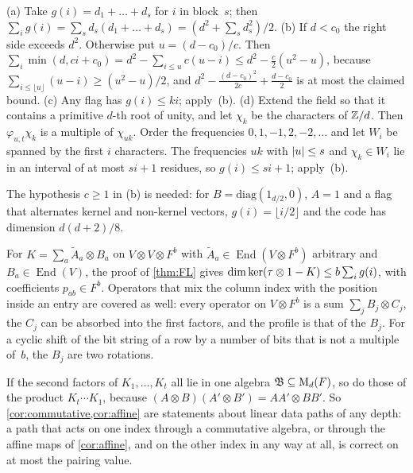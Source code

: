 \begin{informalproof}
(a) Take $g(i)=d_1+\dots+d_s$ for $i$ in block~$s$; then $\sum_ig(i)=\sum_sd_s(d_1+\dots+d_s)=(d^2+\sum_sd_s^2)/2$.
(b) If $d<c_0$ the right side exceeds $d^2$. Otherwise put $u=(d-c_0)/c$. Then
$\sum_i\min(d,ci+c_0)=d^2-\sum_{i\le u}c(u-i)\le d^2-\frac c2(u^2-u)$, because
$\sum_{i\le\lfloor u\rfloor}(u-i)\ge(u^2-u)/2$, and $d^2-\frac{(d-c_0)^2}{2c}+\frac{d-c_0}2$ is at most the claimed
bound. (c) Any flag has $g(i)\le ki$; apply~(b). (d) Extend the field so that it contains a primitive $d$-th root of
unity, and let $\chi_k$ be the characters of $\mathbb{Z}/d$. Then $\varphi_{u,t}\chi_k$ is a multiple of $\chi_{uk}$. Order the
frequencies $0,1,-1,2,-2,\dots$ and let $W_i$ be spanned by the first $i$ characters. The frequencies $uk$ with
$\lvert u \rvert\le s$ and $\chi_k\in W_i$ lie in an interval of at most $si+1$ residues, so $g(i)\le si+1$; apply~(b).
\end{informalproof}

The hypothesis $c\ge1$ in (b) is needed: for $B=\mathrm{diag}(1_{d/2},0)$, $A=1$ and a flag that alternates kernel
and non-kernel vectors, $g(i)=\lfloor i/2\rfloor$ and the code has dimension $d(d+2)/8$.

\begin{remark}\label{rem:entries}
For $K=\sum_a\tilde A_a\otimes B_a$ on $V\otimes V\otimes F^b$ with $\tilde A_a\in\operatorname{End}(V\otimes F^b)$
arbitrary and $B_a\in\operatorname{End}(V)$, the proof of \cref{thm:FL} gives
$\dim\ker(\tau\otimes1-K)\le b\sum_ig(i)$, with coefficients $p_{ab}\in F^b$. Operators that mix the column index
with the position inside an entry are covered as well: every operator on $V\otimes F^b$ is a sum $\sum_jB_j\otimes C_j$,
the $C_j$ can be absorbed into the first factors, and the profile is that of the $B_j$. For a cyclic shift of the bit
string of a row by a number of bits that is not a multiple of~$b$, the $B_j$ are two rotations.
\end{remark}

\begin{remark}[Composition]\label{rem:composition}
If the second factors of $K_1,\dots,K_t$ all lie in one algebra $\mathfrak B\subseteq\mathrm{M}_d(F)$, so do those of the
product $K_t\cdots K_1$, because $(A\otimes B)(A'\otimes B')=AA'\otimes BB'$. So \cref{cor:commutative,cor:affine} are
statements about linear data paths of any depth: a path that acts on one index through a commutative algebra, or through
the affine maps of \cref{cor:affine}, and on the other index in any way at all, is correct on at most the pairing value.
\end{remark}

